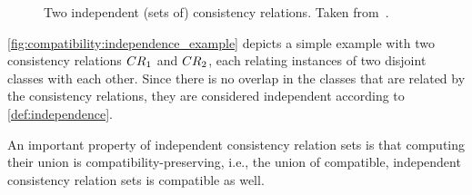 \begin{figure}
    \centering
    
    \caption[Two independent sets of consistency relations]{Two independent (sets of) consistency relations. Taken from~.}
    \label{fig:compatibility:independence_example}
\end{figure}

\begin{example}
\autoref{fig:compatibility:independence_example} depicts a simple example with two consistency relations $\consistencyrelation{CR}{1}$ and $\consistencyrelation{CR}{2}$, each relating instances of two disjoint classes with each other.
Since there is no overlap in the classes that are related by the consistency relations, they are considered independent according to \autoref{def:independence}.
\end{example}

An important property of independent consistency relation sets is that computing their union is compatibility-preserving, i.e., the union of compatible, independent consistency relation sets is compatible as well.

